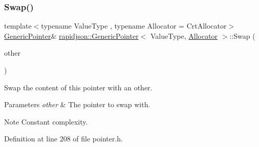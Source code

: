 \subsubsection{\texorpdfstring{Swap()}{Swap()}}
{\footnotesize\ttfamily template$<$typename Value\+Type , typename Allocator  = Crt\+Allocator$>$ \\
\mbox{\hyperlink{classrapidjson_1_1_generic_pointer}{Generic\+Pointer}}\& \mbox{\hyperlink{classrapidjson_1_1_generic_pointer}{rapidjson\+::\+Generic\+Pointer}}$<$ Value\+Type, \mbox{\hyperlink{classrapidjson_1_1_allocator}{Allocator}} $>$\+::Swap (\begin{DoxyParamCaption}\item[{\mbox{\hyperlink{classrapidjson_1_1_generic_pointer}{Generic\+Pointer}}$<$ Value\+Type, \mbox{\hyperlink{classrapidjson_1_1_allocator}{Allocator}} $>$ \&}]{other }\end{DoxyParamCaption})}



Swap the content of this pointer with an other. 


\begin{DoxyParams}{Parameters}
{\em other} & The pointer to swap with. \\
\hline
\end{DoxyParams}
\begin{DoxyNote}{Note}
Constant complexity. 
\end{DoxyNote}


Definition at line 208 of file pointer.\+h.


